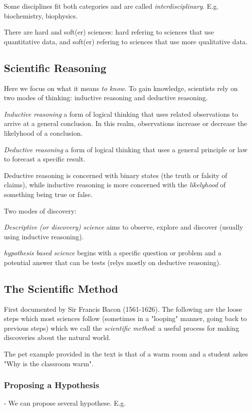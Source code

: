\documentclass{article}
\theoremstyle{definition}
\begin{document}
Some disciplines fit both categories and are called \textit{interdisciplinary}.
E.g. biochemistry, biophysics.

There are hard and soft(er) sciences: hard refering to sciences that use quantitative data, and soft(er) refering to sciences that use more qualitative data.

\subsection{Scientific Reasoning}
Here we focus on what it means \textit{to know}. To gain knowledge, scientists rely on two modes of thinking: inductive reasoning and deductive reasoning.

 \textit{Inductive reasoning}
a form of logical thinking that uses related observations to arrive at a general conclusion. In this realm, observations increase or decrease the likelyhood of a conclusion.

 \textit{Deductive reasoning}
a form of logical thinking that uses a general principle or law to forecast a specific result.

Deductive reasoning is concerned with binary states (the truth or falsity of claims), while inductive reasoning is more concerned with the \textit{likelyhood} of something being true or false.

Two modes of discovery:

 \textit{Descriptive (or discovery) science}
aims to observe, explore and discover (usually using inductive reasoning).

 \textit{hypothesis based science}
begins with a specific question or problem and a potential answer that can be tests (relys mostly on deductive reasoning).

\subsection{The Scientific Method}
First documented by Sir Francis Bacon (1561-1626). The following are the loose steps which most sciences follow (sometimes in a "looping" manner, going back to previous steps) which we call the \textit{scientific method}: a useful process for making discoveries about the natural world.

The pet example provided in the text is that of a warm room and a student askes "Why is the classroom warm".

\subsubsection{Proposing a Hypothesis}
\indent- We can propose several hypothese. E.g.
\end{document}
